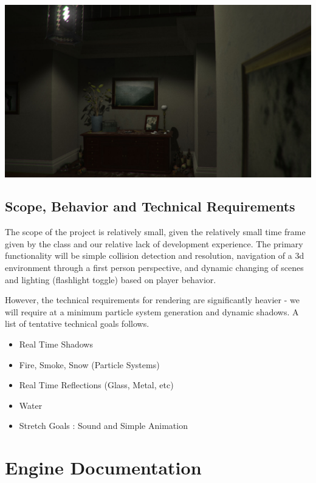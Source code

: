 \documentclass[11pt]{article} %
\begin{document}
\includegraphics[scale=.2]{Media/pt2.jpg} \\
\subsection{Scope, Behavior and Technical Requirements}
The scope of the project is relatively small, given the relatively small time frame given by the class and our relative lack of development experience. The primary functionality will be simple collision detection and resolution, navigation of a 3d environment through a first person perspective, and dynamic changing of scenes and lighting (flashlight toggle) based on player behavior.

However, the technical requirements for rendering are significantly heavier - we will require at a minimum particle system generation and dynamic shadows. A list of tentative technical goals follows.

\begin{itemize}
\item Real Time Shadows
\item Fire, Smoke, Snow (Particle Systems)
\item Real Time Reflections (Glass, Metal, etc)
\item Water
\item Stretch Goals : Sound and Simple Animation
\end{itemize} 

\newpage
\section{Engine Documentation}
\end{document}
